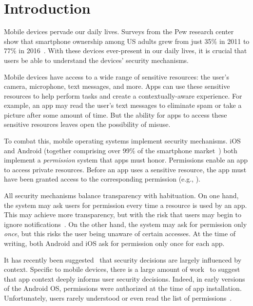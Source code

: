 
\renewcommand{\thechapter}{1}

\chapter{Introduction}

Mobile devices pervade our daily lives. Surveys from the Pew research
center show that smartphone ownership among US adults grew from just
35\% in 2011 to 77\% in 2016~\cite{pewmobile}. With these devices
ever-present in our daily lives, it is crucial that users be able to
understand the devices' security mechanisms.

Mobile devices have access to a wide range of sensitive resources: the
user's camera, microphone, text messages, and more. Apps can use these
sensitive resources to help perform tasks and create a
contextually-aware experience. For example, an app may read the user's
text messages to eliminate spam or take a picture after some amount of
time. But the ability for apps to access these sensitive resources
leaves open the possibility of misuse.

To combat this, mobile operating systems implement security
mechanisms. iOS and Android (together comprising over 99\% of the
smartphone market~\cite{vincent_2017}) both implement a
\emph{permission} system that apps must honor. Permissions enable an
app to access private resources. Before an app uses a sensitive
resource, the app must have been granted access to the corresponding
permission (e.g., ).

All security mechanisms balance transparency with habituation. On one
hand, the system may ask users for permission every time a resource is
used by an app. This may achieve more transparency, but with the risk
that users may begin to ignore notifications~. On the other
hand, the system may ask for permission only \emph{once}, but this
risks the user being unaware of certain accesses. At the time of
writing, both Android and iOS ask for permission only once for each
app.

It has recently been suggested~\cite{Nissenbaum:2004} that security
decisions are largely influenced by context. Specific to mobile
devices, there is a large amount of
work~\cite{King:2012,Balebako:2013,Fu:2014,Wijesekera:2015} to suggest
that app context deeply informs user security decisions. Indeed, in
early versions of the Android OS, permissions were authorized at the
time of app installation. Unfortunately, users rarely understood or
even read the list of permissions~\cite{Felt:2012soups}.


